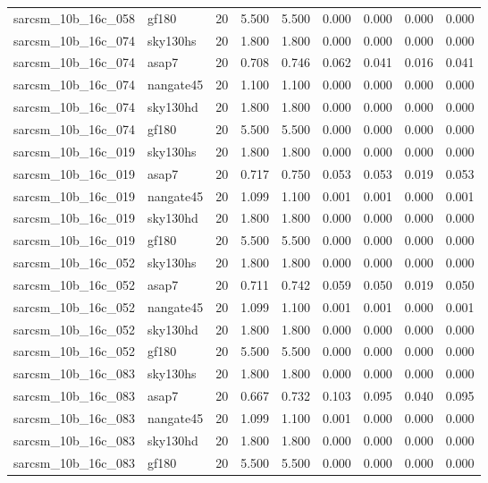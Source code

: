 \begin{tabular}{llrrrrrrr}
sarcsm\_10b\_16c\_058 & gf180 & 20 & 5.500 & 5.500 & 0.000 & 0.000 & 0.000 & 0.000 \\
sarcsm\_10b\_16c\_074 & sky130hs & 20 & 1.800 & 1.800 & 0.000 & 0.000 & 0.000 & 0.000 \\
sarcsm\_10b\_16c\_074 & asap7 & 20 & 0.708 & 0.746 & 0.062 & 0.041 & 0.016 & 0.041 \\
sarcsm\_10b\_16c\_074 & nangate45 & 20 & 1.100 & 1.100 & 0.000 & 0.000 & 0.000 & 0.000 \\
sarcsm\_10b\_16c\_074 & sky130hd & 20 & 1.800 & 1.800 & 0.000 & 0.000 & 0.000 & 0.000 \\
sarcsm\_10b\_16c\_074 & gf180 & 20 & 5.500 & 5.500 & 0.000 & 0.000 & 0.000 & 0.000 \\
sarcsm\_10b\_16c\_019 & sky130hs & 20 & 1.800 & 1.800 & 0.000 & 0.000 & 0.000 & 0.000 \\
sarcsm\_10b\_16c\_019 & asap7 & 20 & 0.717 & 0.750 & 0.053 & 0.053 & 0.019 & 0.053 \\
sarcsm\_10b\_16c\_019 & nangate45 & 20 & 1.099 & 1.100 & 0.001 & 0.001 & 0.000 & 0.001 \\
sarcsm\_10b\_16c\_019 & sky130hd & 20 & 1.800 & 1.800 & 0.000 & 0.000 & 0.000 & 0.000 \\
sarcsm\_10b\_16c\_019 & gf180 & 20 & 5.500 & 5.500 & 0.000 & 0.000 & 0.000 & 0.000 \\
sarcsm\_10b\_16c\_052 & sky130hs & 20 & 1.800 & 1.800 & 0.000 & 0.000 & 0.000 & 0.000 \\
sarcsm\_10b\_16c\_052 & asap7 & 20 & 0.711 & 0.742 & 0.059 & 0.050 & 0.019 & 0.050 \\
sarcsm\_10b\_16c\_052 & nangate45 & 20 & 1.099 & 1.100 & 0.001 & 0.001 & 0.000 & 0.001 \\
sarcsm\_10b\_16c\_052 & sky130hd & 20 & 1.800 & 1.800 & 0.000 & 0.000 & 0.000 & 0.000 \\
sarcsm\_10b\_16c\_052 & gf180 & 20 & 5.500 & 5.500 & 0.000 & 0.000 & 0.000 & 0.000 \\
sarcsm\_10b\_16c\_083 & sky130hs & 20 & 1.800 & 1.800 & 0.000 & 0.000 & 0.000 & 0.000 \\
sarcsm\_10b\_16c\_083 & asap7 & 20 & 0.667 & 0.732 & 0.103 & 0.095 & 0.040 & 0.095 \\
sarcsm\_10b\_16c\_083 & nangate45 & 20 & 1.099 & 1.100 & 0.001 & 0.000 & 0.000 & 0.000 \\
sarcsm\_10b\_16c\_083 & sky130hd & 20 & 1.800 & 1.800 & 0.000 & 0.000 & 0.000 & 0.000 \\
sarcsm\_10b\_16c\_083 & gf180 & 20 & 5.500 & 5.500 & 0.000 & 0.000 & 0.000 & 0.000 \\

\end{tabular}

